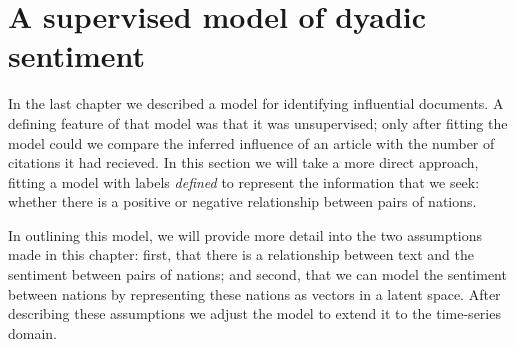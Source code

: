 \section{A supervised model of dyadic sentiment}

\label{section:foreign_relations_supervised_model}

In the last chapter we described a model for identifying influential
documents.  A defining feature of that model was that it was
unsupervised; only after fitting the model could we compare the
inferred influence of an article with the number of citations it had
recieved.  In this section we will take a more direct approach,
fitting a model with labels \emph{defined} to represent the
information that we seek: whether there is a positive or negative
relationship between pairs of nations.

In outlining this model, we will provide more detail into the two
assumptions made in this chapter: first, that there is a relationship
between text and the sentiment between pairs of nations; and second,
that we can model the sentiment between nations by representing
these nations as vectors in a latent space.  After describing these
assumptions we adjust the model to extend it to the time-series
domain.

